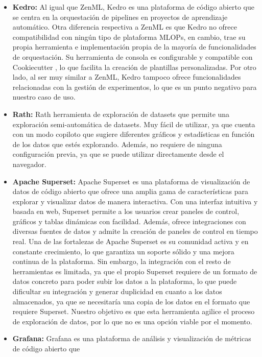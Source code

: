 \begin{itemize}
    \item \textbf{Kedro:} Al igual que ZenML, Kedro \cite{Kedro} es una plataforma de código abierto que se centra en la
    orquestación de pipelines en proyectos de aprendizaje automático. Otra diferencia respectiva a ZenML es
    que Kedro no ofrece compatibilidad con ningún tipo de plataforma MLOPs, en cambio, trae su propia herramienta
    e implementación propia de la mayoría de funcionalidades de orquestación. Su herramienta de consola es configurable 
    y compatible con Cookiecutter \cite{Cookiecutter}, lo que facilita la creación de plantillas personalizadas. Por otro lado, al
    ser muy similar a ZenML, Kedro tampoco ofrece funcionalidades relacionadas con la gestión de experimentos,
    lo que es un punto negativo para nuestro caso de uso. 
    \item \textbf{Rath:} Rath \cite{Rath} herramienta de exploración de datasets que permite una exploración semi-automática
    de datasets. Muy fácil de utilizar, ya que cuenta con un modo copiloto que sugiere di\-fe\-ren\-tes gráficos
    y estadísticas en función de los datos que estés explorando. Además, no requiere de ninguna configuración
    previa, ya que se puede utilizar directamente desde el navegador.
    \item \textbf{Apache Superset:} Apache Superset \cite{ApacheSuperset} es una plataforma de visualización de datos de código abierto 
    que ofrece una amplia gama de características para explorar y visualizar datos de manera interactiva. Con una 
    interfaz intuitiva y basada en web, Superset permite a los usuarios crear paneles de control, gráficos y tablas 
    dinámicas con facilidad. Además, ofrece integraciones con diversas fuentes de datos y admite la creación de 
    paneles de control en tiempo real. Una de las fortalezas de Apache Superset es su comunidad activa y en constante 
    crecimiento, lo que garantiza un soporte sólido y una mejora continua de la plataforma. Sin embargo, la integración
    con el resto de herramientas es limitada, ya que el propio Superset requiere de un formato de datos concreto para
    poder subir los datos a la plataforma, lo que puede dificultar su integración y generar duplicidad en cuanto a los
    datos almacenados, ya que se necesitaría una copia de los datos en el formato que requiere Superset. Nuestro objetivo
    es que esta herramienta agilice el proceso de exploración de datos, por lo que no es una opción viable por el momento.
    \item \textbf{Grafana:} Grafana \cite{grafana} es una plataforma de análisis y visualización de métricas de código abierto que 

\end{itemize}
